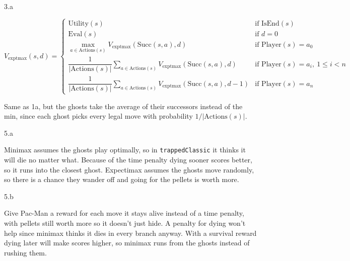 \LARGE
3.a
\normalsize

\begin{answer}
  \[
    V_{\text{exptmax}}(s, d) =
    \begin{cases}
      \text{Utility}(s)
        & \text{if } \text{IsEnd}(s) \\
      \text{Eval}(s)
        & \text{if } d = 0 \\
      \max_{a \in \text{Actions}(s)} V_{\text{exptmax}}(\text{Succ}(s, a), d)
        & \text{if } \text{Player}(s) = a_0 \\
      \dfrac{1}{\lvert \text{Actions}(s) \rvert} \sum_{a \in \text{Actions}(s)} V_{\text{exptmax}}(\text{Succ}(s, a), d)
        & \text{if } \text{Player}(s) = a_i,\ 1 \le i < n \\
      \dfrac{1}{\lvert \text{Actions}(s) \rvert} \sum_{a \in \text{Actions}(s)} V_{\text{exptmax}}(\text{Succ}(s, a), d - 1)
        & \text{if } \text{Player}(s) = a_n
    \end{cases}
  \]

  Same as 1a, but the ghosts take the average of their successors instead of the min, since each
  ghost picks every legal move with probability $1 / \lvert \text{Actions}(s) \rvert$.
\end{answer}
\clearpage


\LARGE
5.a
\normalsize

\begin{answer}
  Minimax assumes the ghosts play optimally, so in \texttt{trappedClassic} it thinks it will die no
  matter what. Because of the time penalty dying sooner scores better, so it runs into the closest
  ghost. Expectimax assumes the ghosts move randomly, so there is a chance they wander off and going
  for the pellets is worth more.
\end{answer}
\clearpage

\LARGE
5.b
\normalsize

\begin{answer}
  Give Pac-Man a reward for each move it stays alive instead of a time penalty, with pellets still
  worth more so it doesn't just hide. A penalty for dying won't help since minimax thinks it dies in
  every branch anyway. With a survival reward dying later will make scores higher, so minimax runs from the
  ghosts instead of rushing them.
\end{answer}
\clearpage

